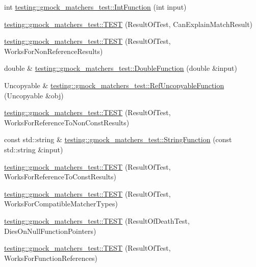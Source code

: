\begin{DoxyCompactItemize}
\item 
int \mbox{\hyperlink{namespacetesting_1_1gmock__matchers__test_a6e957b9dcda1186c6274a8895d1514b5}{testing\+::gmock\+\_\+matchers\+\_\+test\+::\+Int\+Function}} (int input)
\item 
\mbox{\hyperlink{namespacetesting_1_1gmock__matchers__test_ab7fe283b2955ca8bb11b2984a08eef33}{testing\+::gmock\+\_\+matchers\+\_\+test\+::\+T\+E\+ST}} (Result\+Of\+Test, Can\+Explain\+Match\+Result)
\item 
\mbox{\hyperlink{namespacetesting_1_1gmock__matchers__test_a86f01e29ee48050d401fceca21d1041e}{testing\+::gmock\+\_\+matchers\+\_\+test\+::\+T\+E\+ST}} (Result\+Of\+Test, Works\+For\+Non\+Reference\+Results)
\item 
double \& \mbox{\hyperlink{namespacetesting_1_1gmock__matchers__test_a48350ba4c1ce65694ec07e9c1c49a452}{testing\+::gmock\+\_\+matchers\+\_\+test\+::\+Double\+Function}} (double \&input)
\item 
Uncopyable \& \mbox{\hyperlink{namespacetesting_1_1gmock__matchers__test_aa6f7dd285163d5880cfd6685bec8cab4}{testing\+::gmock\+\_\+matchers\+\_\+test\+::\+Ref\+Uncopyable\+Function}} (Uncopyable \&obj)
\item 
\mbox{\hyperlink{namespacetesting_1_1gmock__matchers__test_a505e866c4066d27854cb6754c66a3eec}{testing\+::gmock\+\_\+matchers\+\_\+test\+::\+T\+E\+ST}} (Result\+Of\+Test, Works\+For\+Reference\+To\+Non\+Const\+Results)
\item 
const std\+::string \& \mbox{\hyperlink{namespacetesting_1_1gmock__matchers__test_abe0b3ba3be22e6b973ac6aa226ae85f3}{testing\+::gmock\+\_\+matchers\+\_\+test\+::\+String\+Function}} (const std\+::string \&input)
\item 
\mbox{\hyperlink{namespacetesting_1_1gmock__matchers__test_a17b952cce22be6338fb1369f886d61c4}{testing\+::gmock\+\_\+matchers\+\_\+test\+::\+T\+E\+ST}} (Result\+Of\+Test, Works\+For\+Reference\+To\+Const\+Results)
\item 
\mbox{\hyperlink{namespacetesting_1_1gmock__matchers__test_a1aceb307c843f0f5532053e390a7c654}{testing\+::gmock\+\_\+matchers\+\_\+test\+::\+T\+E\+ST}} (Result\+Of\+Test, Works\+For\+Compatible\+Matcher\+Types)
\item 
\mbox{\hyperlink{namespacetesting_1_1gmock__matchers__test_a4c929e5b46a503a9bb48c8b88dcbbf2a}{testing\+::gmock\+\_\+matchers\+\_\+test\+::\+T\+E\+ST}} (Result\+Of\+Death\+Test, Dies\+On\+Null\+Function\+Pointers)
\item 
\mbox{\hyperlink{namespacetesting_1_1gmock__matchers__test_a1638ee6460100cbe21c65b6cdc06579a}{testing\+::gmock\+\_\+matchers\+\_\+test\+::\+T\+E\+ST}} (Result\+Of\+Test, Works\+For\+Function\+References)

\end{DoxyCompactItemize}
